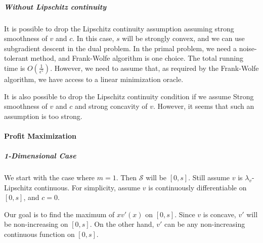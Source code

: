 \documentclass{article}
\begin{document}
\subparagraph{Without Lipschitz continuity}
It is possible to drop the Lipschitz continuity assumption assuming strong smoothness of $v$ and $c$. In this case, $s$ will be strongly convex, and we can use subgradient descent in the dual problem. In the primal problem, we need a noise-tolerant method, and Frank-Wolfe algorithm is one choice. The total running time is $O(\frac{1}{\epsilon^5})$. However, we need to assume that, as required by the Frank-Wolfe algorithm, we have access to a linear minimization oracle.

It is also possible to drop the Lipschitz continuity condition if we assume Strong smoothness of $v$ and $c$ and strong concavity of $v$. However, it seems that such an assumption is too strong.

\paragraph{Profit Maximization}
\subparagraph{1-Dimensional Case}
We start with the case where $m=1$. Then $\mathcal{S}$ will be $[0,s]$. Still assume $v$ is $\lambda_v$-Lipschitz continuous. For simplicity, assume $v$ is continuously differentiable on $[0,s]$, and $c=0$.

Our goal is to find the maximum of $xv'(x)$ on $[0,s]$. Since $v$ is concave, $v'$ will be non-increasing on $[0,s]$. On the other hand, $v'$ can be any non-increasing continuous function on $[0,s]$.
\end{document}
